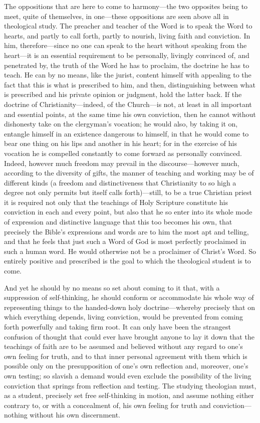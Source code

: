 \documentclass[12pt,a4paper]{book}
\begin{document}
The oppositions that are here to come to harmony---the two opposites being to meet, quite of
themselves, in one---these oppositions are seen above all in theological study. The preacher and
teacher of the Word is to speak the Word to hearts, and partly to call forth, partly to nourish,
living faith and conviction. In him, therefore---since no one can speak to the heart without
speaking from the heart---it is an essential requirement to be personally, livingly convinced of,
and penetrated by, the truth of the Word he has to proclaim, the doctrine he has to teach. He can
by no means, like the jurist, content himself with appealing to the fact that this is what is
prescribed to him, and then, distinguishing between what is prescribed and his private opinion or
judgment, hold the latter back. If the doctrine of Christianity---indeed, of the Church---is not,
at least in all important and essential points, at the same time his own conviction, then he
cannot without dishonesty take on the clergyman's vocation; he would also, by taking it on,
entangle himself in an existence dangerous to himself, in that he would come to bear one thing on
his lips and another in his heart; for in the exercise of his vocation he is compelled constantly
to come forward as personally convinced. Indeed, however much freedom may prevail in the
discourse---however much, according to the diversity of gifts, the manner of teaching and working
may be of different kinds (a freedom and distinctiveness that Christianity to so high a degree not
only permits but itself calls forth)---still, to be a true Christian priest it is required not only
that the teachings of Holy Scripture constitute his conviction in each and every point, but also
that he so enter into its whole mode of expression and distinctive language that this too becomes
his own, that precisely the Bible's expressions and words are to him the most apt and telling, and
that he feels that just such a Word of God is most perfectly proclaimed in such a human word. He
would otherwise not be a proclaimer of Christ's Word. So entirely positive and prescribed is the
goal to which the theological student is to come.

And yet he should by no means so set about coming to it that, with a suppression of self-thinking,
he should conform or accommodate his whole way of representing things to the handed-down holy
doctrine---whereby precisely that on which everything depends, living conviction, would be
prevented from coming forth powerfully and taking firm root. It can only have been the strangest
confusion of thought that could ever have brought anyone to lay it down that the teachings of faith
are to be assumed and believed without any regard to one's own feeling for truth, and to that inner
personal agreement with them which is possible only on the presupposition of one's own reflection
and, moreover, one's own testing; so slavish a demand would even exclude the possibility of the
living conviction that springs from reflection and testing. The studying theologian must, as a
student, precisely set free self-thinking in motion, and assume nothing either contrary to, or with
a concealment of, his own feeling for truth and conviction---nothing without his own discernment.
\end{document}
